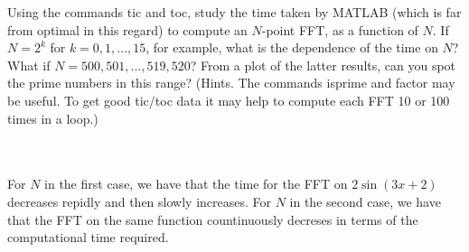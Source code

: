 Using the commands tic and toc, study the time taken by MATLAB (which is far from optimal in this
regard) to compute an $N$-point FFT, as a function of $N$. If $N=2^k$ for $k=0,1, ... ,15$, for example,
what is the dependence of the time on $N$? What if $N=500, 501, ... , 519,520$? From a plot of the
latter results, can you spot the prime numbers in this range? (Hints. The commands isprime and factor
may be useful. To get good tic/toc data it may help to compute each FFT 10 or 100 times in a loop.)\\\\

\begin{solution}\renewcommand{\qedsymbol}{}\ \\
    For $N$ in the first case, we have that the time for the FFT on $2\sin(3x+2)$ decreases repidly and
    then slowly increases. For $N$ in the second case, we have that the FFT on the same function
    countinuously decreses in terms of the computational time required.

\end{solution}

\newpage

\newpage